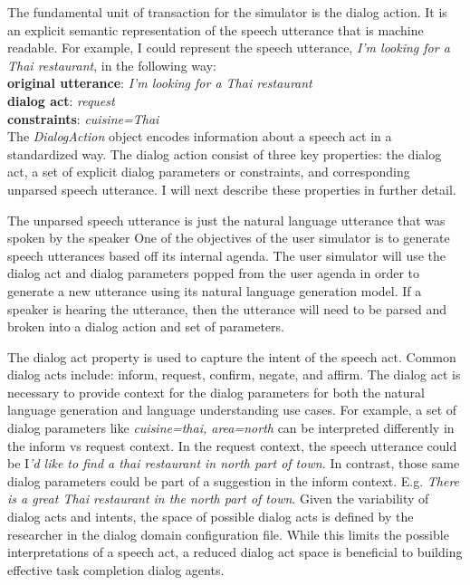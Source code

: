 The fundamental unit of transaction for the simulator is the dialog action. It is an explicit semantic representation of the speech utterance that is machine readable. For example, I could represent the speech utterance, \textit{I'm looking for a Thai restaurant}, in the following way: \\
\textbf{original utterance}: \textit{I'm looking for a Thai restaurant}   \\
\textbf{dialog act}: \textit{request}\\ 
\textbf{constraints}: \textit{cuisine=Thai}\\

The \textit{DialogAction} object encodes information about a speech act in a standardized way. The dialog action consist of three key properties: the dialog act, a set of explicit dialog parameters or constraints, and corresponding unparsed speech utterance. I will next describe these properties in further detail. 

The unparsed speech utterance is just the natural language utterance that was spoken by the speaker One of the objectives of the user simulator is to generate speech utterances based off its internal agenda. The user simulator will use the dialog act and dialog parameters popped from the user agenda in order to generate a new utterance using its natural language generation model. If a speaker is hearing the utterance, then the utterance will need to be parsed and broken into a dialog action and set of parameters. 

The dialog act property is used to capture the intent of the speech act. Common dialog acts include: inform, request, confirm, negate, and affirm. The dialog act is necessary to provide context for the dialog parameters for both the natural language generation and language understanding use cases. For example, a set of dialog parameters like \textit{{cuisine=thai, area=north}} can be interpreted differently in the inform vs request context. In the request context, the speech utterance could be I\textit{'d like to find a thai restaurant in north part of town.} In contrast, those same dialog parameters could be part of a suggestion in the inform context. E.g. \textit{There is a great Thai restaurant in the north part of town}. Given the variability of dialog acts and intents, the space of possible dialog acts is defined by the researcher in the dialog domain configuration file. While this limits the possible interpretations of a speech act, a reduced dialog act space is beneficial to building effective task completion dialog agents.  

